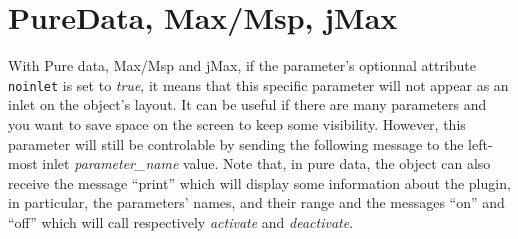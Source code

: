 \section{PureData, Max/Msp, jMax}
\noindent With Pure data, Max/Msp and jMax, if the parameter's optionnal attribute
\verb|noinlet| is set to \emph{true}, it means that this specific
parameter will not appear as an inlet on the object's layout. It can
be useful if there are many parameters and you want to save space on
the screen to keep some visibility. However, this parameter will still
be controlable by sending the following message to the left-most inlet
\textit{parameter\_name} value. Note that, in pure data, the object
can also receive the message ``print'' which will display some
information about the plugin, in particular, the parameters' names,
and their range and the messages ``on'' and ``off'' which will call
respectively \emph{activate} and \emph{deactivate}.  